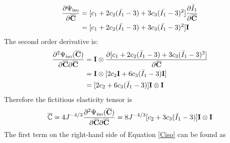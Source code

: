 \begin{equation}
\begin{split}
\frac{\partial{\Psi_\mathrm{iso}}}{\partial{\overline{\bold{C}}}} 
&= [c_1 + 2c_2(\bar{I_1} - 3) + 3c_3(\bar{I_1} - 3)^2] \frac{\partial{\bar{I}_1}}{\partial{\overline{\bold{C}}}} \\
&= [c_1 + 2c_2(\bar{I_1} - 3) + 3c_3(\bar{I_1} - 3)^2] \bold{I} 
\end{split}
\end{equation}
The second order derivative is:
\begin{equation}
\begin{split}
\frac{\partial^2\Psi_\mathrm{iso}(\overline{\bold{C}})}{\partial\overline{\bold{C}}\partial\overline{\bold{C}}} &= 
\bold{I} \otimes \frac{\partial[c_1 + 2c_2({\bar{I}}_1-3) + 3c_3({\bar{I}}_1-3)^2 ]}{\partial{\overline{\bold{C}}}} \\
&= \bold{I} \otimes [2c_2\bold{I} + 6c_3({\bar{I}}_1-3)\bold{I}]\\
&= [2c_2 + 6c_3({\bar{I}}_1-3)] \bold{I} \otimes \bold{I}
\end{split}
\end{equation}
Therefore the fictitious elasticity tensor is
\begin{equation}
\overline{\mathbb{C}} = 4J^{-4/3}\frac{\partial^2\Psi_\mathrm{iso}(\overline{\bold{C}})}{\partial{\overline{\bold{C}}}{\partial{\overline{\bold{C}}}}} = 8J^{-4/3}[c_2 + 3c_3({\bar{I}}_1 - 3) ]\bold{I} \otimes \bold{I}
\end{equation}
The first term on the right-hand side of Equation \ref{Ciso} can be found as

